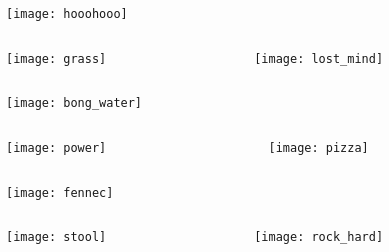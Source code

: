 \documentclass{beamer}
\begin{document}
\begin{frame}
  \texttt{[image: hooohooo]}

\end{frame}

\begin{frame}
  \begin{columns}
    \begin{column}{0.5\textwidth}
      \texttt{[image: grass]}
    \end{column}
    \begin{column}{0.5\textwidth}
      \texttt{[image: lost\_mind]}
    \end{column}
  \end{columns}
\end{frame}

\begin{frame}
  \texttt{[image: bong\_water]}

\end{frame}

\begin{frame}
  \begin{columns}
    \begin{column}{0.5\textwidth}
      \texttt{[image: power]}
    \end{column}
    \begin{column}{0.5\textwidth}
      \texttt{[image: pizza]}
    \end{column}
  \end{columns}

\end{frame}

\begin{frame}
  \texttt{[image: fennec]}

\end{frame}

\begin{frame}
  \begin{columns}
    \begin{column}{0.5\textwidth}
      \texttt{[image: stool]}
    \end{column}
    \begin{column}{0.5\textwidth}
      \texttt{[image: rock\_hard]}
    \end{column}
  \end{columns}
\end{frame}
\end{document}

